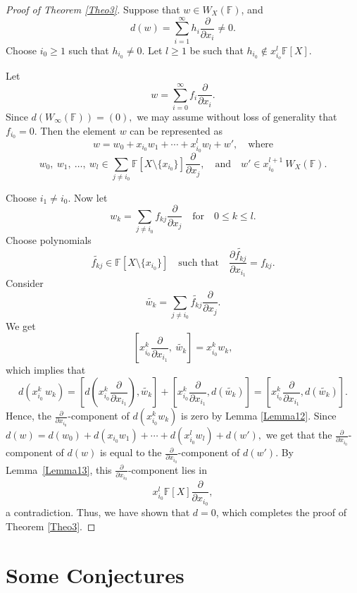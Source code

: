 \documentclass[12pt,a4paper]{amsart}
\theoremstyle{plain}
\begin{document}
	
	
	\begin{proof}[Proof of Theorem \ref{Theo3}] Suppose that $w \in W_X(\mathbb{F})$, and  \[ d(w) = \sum_{i=1}^{\infty} h_i \frac{\partial}{\partial x_i}  \neq 0 .\] Choose \( i_0 \geq 1 \) such that \( h_{i_0} \neq 0 \). Let \( l \geq 1 \) be such that \( h_{i_0} \notin x_{i_o}^l \mathbb{F}[X] \).
		
		Let 
		\[
		w = \sum_{i=0}^\infty f_i \frac{\partial}{\partial x_i}.
		\]
		Since \( d(W_{\infty}(\mathbb{F})) = (0) ,\) we may assume without loss of generality that \( f_{i_0} = 0 \). Then the element \( w \) can be represented as
		\[
		w = w_0 + x_{i_0} w_1 +  \cdots + x_{i_0}^l w_l + w', \quad \text{where}
		\]
		\[  w_0, \ w_1, \ \dots, \ w_l \in \sum_{j \neq i_0} \mathbb{F}[X \setminus \{x_{i_0}\}]  \frac{\partial}{\partial x_j}, \quad \text{and} \quad w' \in x_{i_0}^{l+1} \ W_X(\mathbb{F}) .\]
		
		Choose  $i_1 \neq i_0.$ Now let 
		\[
		w_k = \sum_{j \neq i_0} f_{k j}  \frac{\partial}{\partial x_j} \quad \text{for} \quad 0 \leq k \leq l.
		\] Choose polynomials $$\widetilde{f_{kj}} \in \mathbb{F}[X \setminus \{x_{i_0}\}] \quad \text{such that} \quad  \frac{\partial \widetilde{f_{kj}}}{\partial x_{i_1}}=f_{kj}.$$ Consider $$ 
		\widetilde{w_k} = \sum_{j \neq i_0} \widetilde{f_{k j}}  \frac{\partial}{\partial x_j} .$$ We get
		\[
		\left[ x_{i_0}^k \frac{\partial}{\partial x_{i_1}}, \ \widetilde{w_k} \right] = x_{i_0}^k w_k,\] which implies that \[  d( x_{i_0}^k\, w_k )= \left[d\left( x_{i_0}^k \frac{\partial}{\partial x_{i_1}} \right),  \widetilde{w_k} \right] +\left[ x_{i_0}^k \frac{\partial}{\partial x_{i_1}},  d(\widetilde{w_k}) \right]=  \left[ x_{i_0}^k \frac{\partial}{\partial x_{i_1}},  d(\widetilde{w_k}) \right].
		\]
		Hence, the \( \frac{\partial}{\partial x_{i_0}} \)-component of \( d\left( x_{i_0}^k w_k\right) \) is zero by Lemma \ref{Lemma12}. Since $d(w)=d(w_0)+d(x_{i_0}w_1)+\cdots + d(x_{i_0}^l w_l)+ d(w'),$ we get that the \( \frac{\partial}{\partial x_{i_0}} \)-component of \( d(w) \) is equal to the \( \frac{\partial}{\partial x_{i_0}} \)-component of \( d(w') \). By Lemma~\ref{Lemma13}, this $  \frac{\partial}{\partial x_{i_0}}$-component lies in $$ x_{i_0}^l\mathbb{F}[X] \frac{\partial}{\partial x_{i_0}} ,$$ a contradiction. Thus, we have shown that \( d = 0 \), which completes the proof of Theorem \ref{Theo3}. \end{proof}
	
	\section{Some Conjectures}
	
\end{document}
